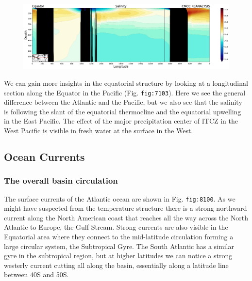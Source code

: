 \begin{figure}
\centering
\includegraphics[width = .7 \textwidth]{figs/GD/SectSalinityEquator1000.png}
\caption{} \label{fig:}
\end{figure}

We can gain more insights in the equatorial structure by looking at a
longitudinal section along the Equator in the Pacific (Fig.
\texttt{fig:7103}). Here we see the general difference between the
Atlantic and the Pacific, but we also see that the salinity is following
the slant of the equatorial thermocline and the equatorial upwelling in
the East Pacific. The effect of the major precipitation center of ITCZ
in the West Pacific is visible in fresh water at the surface in the
West.

\subsection{Ocean Currents}\label{ocean-currents}

\subsubsection{The overall basin
circulation}\label{the-overall-basin-circulation}

The surface currents of the Atlantic ocean are shown in Fig.
\texttt{fig:8100}. As we might have suspected from the temperature
structure there is a strong northward current along the North American
coast that reaches all the way across the North Atlantic to Europe, the
Gulf Stream. Strong currents are also visible in the Equatorial area
where they connect to the mid-latitude circulation forming a large
circular system, the Subtropical Gyre. The South Atlantic has a similar
gyre in the subtropical region, but at higher latitudes we can notice a
strong westerly current cutting all along the basin, essentially along a
latitude line between 40S and 50S.

